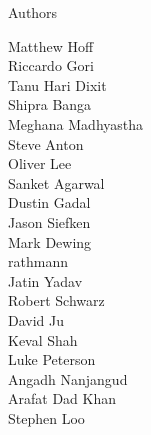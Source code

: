 \begin{frame}{Authors}
\begin{multicols}{5}
Matthew Hoff\\
Riccardo Gori\\
Tanu Hari Dixit\\
Shipra Banga\\
Meghana Madhyastha\\
Steve Anton\\
Oliver Lee\\
Sanket Agarwal\\
Dustin Gadal\\
Jason Siefken\\
Mark Dewing\\
rathmann\\
Jatin Yadav\\
Robert Schwarz\\
David Ju\\
Keval Shah\\
Luke Peterson\\
Angadh Nanjangud\\
Arafat Dad Khan\\
Stephen Loo\\
\end{multicols}
\end{frame}
